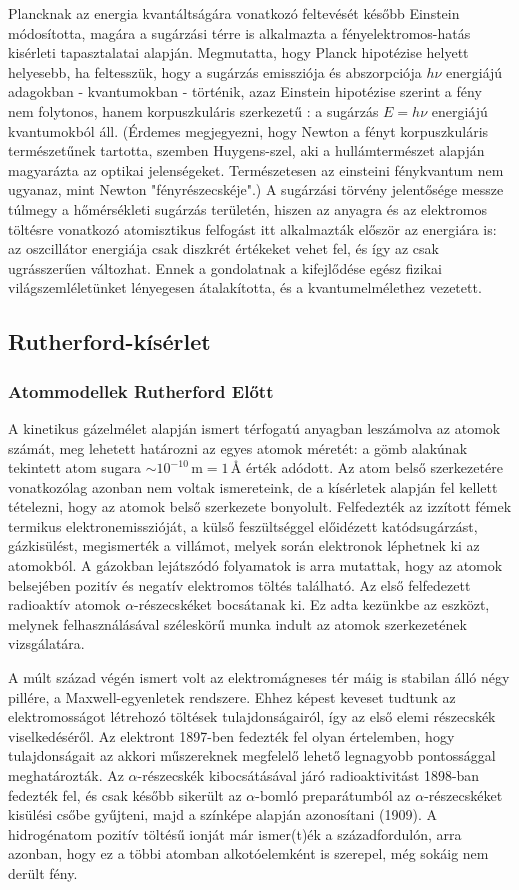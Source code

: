 \documentclass[a4paper,12pt]{article}
\begin{document}
Plancknak az energia kvantáltságára vonatkozó feltevését később Einstein módosította, magára a sugárzási térre is alkalmazta a fényelektromos-hatás
kisérleti tapasztalatai alapján. Megmutatta, hogy Planck hipotézise helyett helyesebb, ha feltesszük, hogy a sugárzás emissziója és abszorpciója $h\nu$ energiájú adagokban - kvantumokban - történik,
azaz Einstein hipotézise szerint a fény nem folytonos, hanem korpuszkuláris szerkezetű : a sugárzás $E = h\nu$ energiájú kvantumokból áll. (Érdemes
megjegyezni, hogy Newton a fényt korpuszkuláris természetűnek tartotta, szemben Huygens-szel, aki a hullámtermészet alapján magyarázta az optikai jelenségeket. Természetesen az einsteini fénykvantum nem ugyanaz, mint
Newton "fényrészecskéje".) A sugárzási törvény jelentősége messze túlmegy a hőmérsékleti sugárzás területén, hiszen az anyagra és az elektromos töltésre vonatkozó atomisztikus felfogást itt alkalmazták először az energiára is: az oszcillátor energiája
csak diszkrét értékeket vehet fel, és így az csak ugrásszerűen változhat. Ennek a gondolatnak a kifejlődése egész fizikai világszemléletünket lényegesen átalakította, és a kvantumelmélethez vezetett.

\subsection{Rutherford-kísérlet}
\subsubsection{Atommodellek Rutherford Előtt}
A kinetikus gázelmélet alapján ismert térfogatú anyagban leszámolva az atomok számát, meg lehetett határozni az egyes atomok méretét: a gömb alakúnak tekintett atom sugara $\sim 10^{-10}\,\mathrm{m}=1\,\text{\AA}$ érték adódott.
Az atom belső szerkezetére vonatkozólag azonban nem voltak ismereteink, de a kísérletek alapján fel kellett tételezni, hogy az atomok belső szerkezete bonyolult. Felfedezték az izzított fémek termikus elektronemisszióját, a külső feszültséggel előidézett katódsugárzást, gázkisülést, megismerték a villámot, melyek során elektronok léphetnek ki az atomokból.
A gázokban lejátszódó folyamatok is arra mutattak, hogy az atomok belsejében pozitív és negatív elektromos töltés található. Az első felfedezett radioaktív atomok $\alpha$-részecskéket bocsátanak ki. Ez adta kezünkbe az eszközt, melynek felhasználásával széleskörű munka indult az atomok szerkezetének vizsgálatára.

A múlt század végén ismert volt az elektromágneses tér máig is stabilan álló négy pillére, a Maxwell-egyenletek rendszere. Ehhez képest keveset tudtunk az elektromosságot létrehozó töltések tulajdonságairól, így az első elemi részecskék viselkedéséről. Az elektront 1897-ben fedezték fel olyan értelemben, hogy tulajdonságait az akkori műszereknek megfelelő lehető legnagyobb pontossággal meghatározták.
Az $\alpha$-részecskék kibocsátásával járó radioaktivitást 1898-ban fedezték fel, és csak később sikerült az $\alpha$-bomló preparátumból az $\alpha$-részecskéket kisülési csőbe gyűjteni, majd a színképe alapján azonosítani (1909). A hidrogénatom pozitív töltésű ionját már ismer(t)ék a századfordulón, arra azonban, hogy ez a többi atomban alkotóelemként is szerepel, még sokáig nem derült fény.
\end{document}
